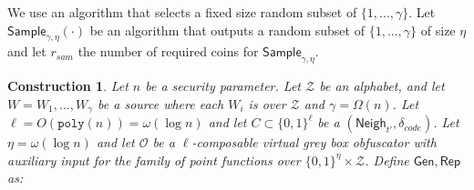 \documentclass[11pt]{article}
\newcommand{\class}[1]{{\ensuremath{\mathsf{#1}}}}
\newcommand{\gen}{\ensuremath{\class{Gen}}\xspace}
\newcommand{\rep}{\ensuremath{\class{Rep}}\xspace}
\newcommand{\zo}{\ensuremath{\{0, 1\}}}
\newcommand{\sample}{\ensuremath{\class{Sample}}\xspace}
\newcommand{\neigh}{\ensuremath{\class{Neigh}}\xspace}
\newcommand{\poly}{\ensuremath{\mathtt{poly}}\xspace}
\newtheorem{construction}[theorem]{Construction}
\begin{document}
We use an algorithm that selects a fixed size random subset of $\{1,..., \gamma\}$.  Let $\sample_{\gamma, \eta}(\cdot)$ be an algorithm that outputs a random subset of $\{1,..., \gamma\}$ of size $\eta$ and let $r_{sam}$ the number of required coins for $\sample_{\gamma, \eta}$.
\begin{construction}
\label{cons:sampling}
Let $n$ be a security parameter.
Let $\mathcal{Z}$ be an alphabet, and let $W = W_1,..., W_\gamma$ be a source where each $W_i$ is over $\mathcal{Z}$ and $\gamma = \Omega(n)$.  Let $\ell = O(\poly(n)) = \omega(\log n)$ and let $C\subset \zo^\ell$ be a $(\neigh_{t'}, \delta_{code})$.   Let $\eta = \omega(\log n)$ and let $\mathcal{O}$ be a $\ell$-composable virtual grey box obfuscator with auxiliary input for the family of point functions over $\zo^\eta\times \mathcal{Z}$.  Define $\gen, \rep$ as:


\end{construction}
\end{document}
